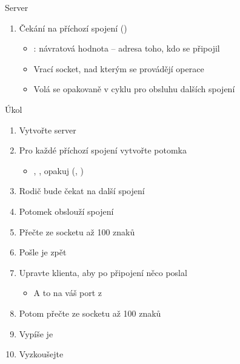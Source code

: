 \begin{frame}[fragile]{Server}
\begin{enumerate}
    \item Čekání na příchozí spojení ()
    \begin{itemize}
      \item {}: návratová hodnota -- adresa toho, kdo se připojil
      \item Vrací socket, nad kterým se provádějí operace

      \pause

      \item Volá se opakovaně v cyklu pro obsluhu dalších spojení
    \end{itemize}

  \end{enumerate}

\end{frame}

\begin{frame}{Úkol}

  \begin{enumerate}
    \item Vytvořte server
    \item Pro každé příchozí spojení vytvořte potomka
    \begin{itemize}
      \item {}, , opakuj (, )
    \end{itemize}

    \item Rodič bude čekat na další spojení
    \item Potomek obslouží spojení
    \item Přečte ze socketu až 100 znaků
    \item Pošle je zpět
    \item Upravte klienta, aby po připojení něco poslal
    \begin{itemize}
      \item A to na váš port z 
    \end{itemize}

    \item Potom přečte ze socketu až 100 znaků
    \item Vypíše je
    \item Vyzkoušejte
  \end{enumerate}

\end{frame}

